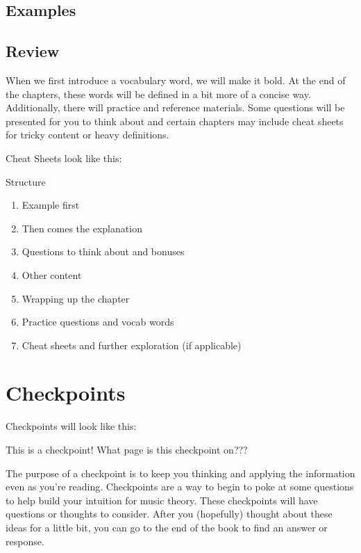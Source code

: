 \documentclass[../OpenAppliedMusicTheory.tex]{subfiles}
\begin{document}
    \subsection{Examples}\label{ch0:examples}

    \subsection{Review}\label{ch0:review}
    When we first introduce a vocabulary word, we will make it bold. At the end of the chapters, these words will be defined in a bit more of a concise way. Additionally, there will practice and reference materials. Some questions will be presented for you to think about and certain chapters may include cheat sheets for tricky content or heavy definitions.

    Cheat Sheets look like this:
    \begin{cheatSheet}{Structure}
        \begin{enumerate}
            \item Example first
            \item Then comes the explanation
            \item Questions to think about and bonuses
            \item Other content
            \item Wrapping up the chapter
            \item Practice questions and vocab words
            \item Cheat sheets and further exploration (if applicable)
        \end{enumerate}
    \end{cheatSheet}

    \section{Checkpoints}\label{ch0:checkpoints}
    Checkpoints will look like this:
    \begin{checkpoint}
        This is a checkpoint! What page is this checkpoint on???
    \end{checkpoint}
    The purpose of a checkpoint is to keep you thinking and applying the information even as you're reading. Checkpoints are a way to begin to poke at some questions to help build your intuition for music theory. These checkpoints will have questions or thoughts to consider. After you (hopefully) thought about these ideas for a little bit, you can go to the end of the book to find an answer or response.
\end{document}
